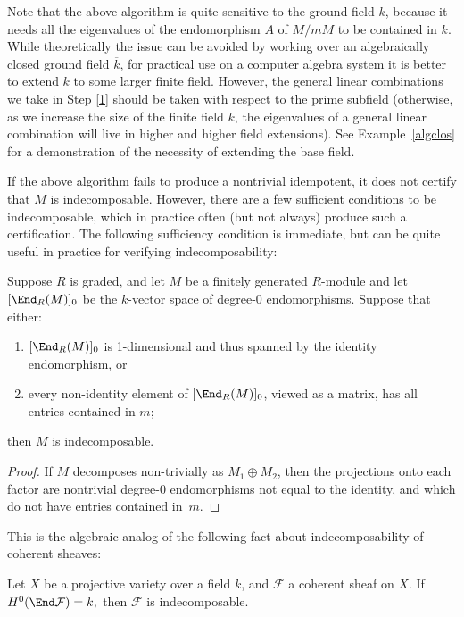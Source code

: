 \documentclass[12pt]{article}
\let\bar\overline
\def\F{\mathcal F}
\numberwithin{equation}{section}
\theoremstyle{theorem}
\numberwithin{thm}{section}
\theoremstyle{definition}
\begin{document}
\begin{rem}
  Note that the above algorithm is quite sensitive to the ground field $k$, because it needs all the eigenvalues of the endomorphism $A$ of $M/mM$ to be contained in $k$. While theoretically the issue can be avoided by working over an algebraically closed ground field $\bar k$, for practical use on a computer algebra system it is better to extend $k$ to some larger finite field. However, the general linear combinations we take in Step \ref{1} should be taken with respect to the prime subfield (otherwise, as we increase the size of the finite field $k$, the eigenvalues of a general linear combination will live in higher and higher field extensions).
See Example~\ref{algclos} for a demonstration of the necessity of extending the base field.
\end{rem}

If the above algorithm fails to produce a nontrivial idempotent, it does not certify that $M$ is indecomposable. However, there are a few sufficient conditions to be indecomposable, which in practice often (but not always) produce such a certification.
The following sufficiency condition is immediate, but can be quite useful in practice for verifying indecomposability:

\begin{lem}
  Suppose $R$ is graded, and let $M$ be a finitely generated $R$-module and let $[\End_R(M)]_0$ be the $k$-vector space of degree-0 endomorphisms. Suppose that either:
  \begin{enumerate}
  \item $[\End_R(M)]_0$ is 1-dimensional and thus spanned by the identity endomorphism, or
  \item every non-identity element of $[\End_R(M)]_0$, viewed as a matrix, has all entries contained in $m$;
  \end{enumerate}
  then $M$ is indecomposable.
\end{lem}

\begin{proof}
  If $M$ decomposes non-trivially as $M_1\oplus M_2$, then the projections onto each factor are nontrivial degree-0 endomorphisms not equal to the identity, and which do not have entries contained in~$m$.
\end{proof}

This is the algebraic analog of the following fact about indecomposability of coherent sheaves:

\begin{cor}
  Let $X$ be a projective variety over a field $k$, and $\F$ a coherent sheaf on $X$.
  If $ H^0(\End \F) = k, $ then $\F$ is indecomposable.
\end{cor}
\end{document}
